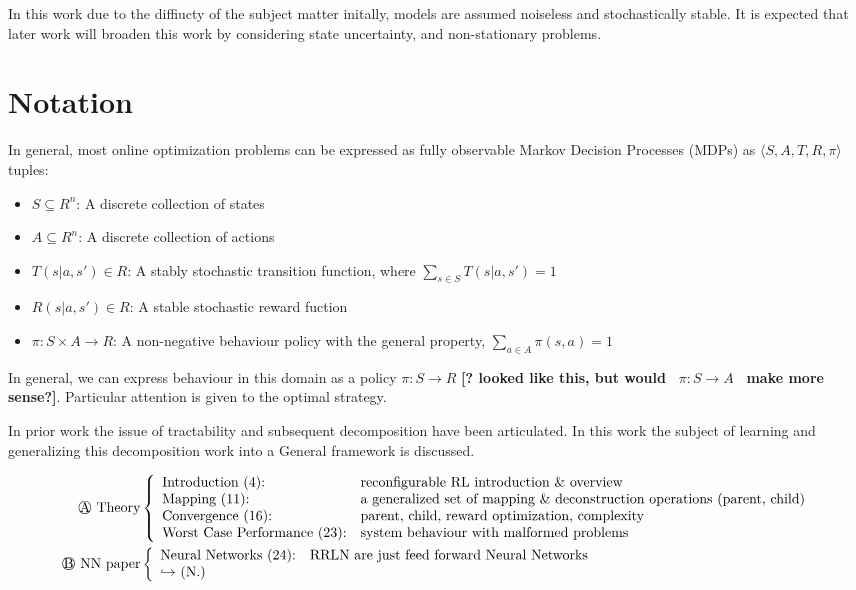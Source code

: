 In this work due to the diffiucty of the subject matter initally, models are assumed noiseless and stochastically stable. It is expected that later work will broaden this work by considering state uncertainty, and non-stationary problems.

\section*{Notation}

In general, most online optimization problems can be expressed as fully observable Markov Decision Processes (MDPs)
as \( \langle S, A, T, R,\pi \rangle \) tuples: 

\begin{itemize}  
\item $S \subseteq R^{n}$:  A discrete collection of states
\item $A \subseteq R^{n}$:  A discrete collection of actions
\item $T(s|a,s') \in R $:  A stably stochastic transition function, where $\sum_{s \in S} T(s|a,s') = 1 $
\item $R(s|a,s') \in R $:  A stable stochastic reward fuction
\item $\pi: S\times A \rightarrow R $:  A non-negative behaviour policy with the general property, $\sum_{a \in A} \pi(s,a) = 1$

\end{itemize}


In general, we can express behaviour in this domain as a policy \( \pi: S\rightarrow R\) {\textbf{[? looked like this, but would\ }}  \(\pi:S\rightarrow A \) 
{\textbf{\ make more sense?]}}. Particular attention is given to the optimal strategy.

In prior work the issue of tractability and subsequent decomposition have been articulated.  In this work the subject of learning
and generalizing this decomposition work into a General framework is discussed.

\begin{align*}
\text{\circled{A} Theory} & \left\{ 
\begin{array}{ll}
\text{Introduction (4):} & \text{reconfigurable RL introduction \& overview} \\
\text{Mapping (11):} & \text{a generalized set of mapping \& deconstruction operations (parent, child)} \\
\text{Convergence (16):} & \text{parent, child, reward optimization, complexity} \\
\text{Worst Case Performance (23):} & \text{system behaviour with malformed problems}
\end{array}
\right. \\
\text{\circled{B} NN paper} & \left\{ 
\begin{array}{ll}
\text{Neural Networks (24):} & \text{RRLN are just feed forward Neural Networks} \\
\text{\(\hookrightarrow\) (N.)} &  \text{\ }
\end{array}
\right.
\end{align*}

